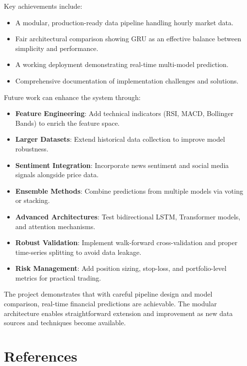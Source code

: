 \documentclass[conference]{IEEEtran}
\begin{document}
Key achievements include:
\begin{itemize}
    \item A modular, production-ready data pipeline handling hourly market data.
    \item Fair architectural comparison showing GRU as an effective balance between simplicity and performance.
    \item A working deployment demonstrating real-time multi-model prediction.
    \item Comprehensive documentation of implementation challenges and solutions.
\end{itemize}

Future work can enhance the system through:
\begin{itemize}
    \item \textbf{Feature Engineering}: Add technical indicators (RSI, MACD, Bollinger Bands) to enrich the feature space.
    \item \textbf{Larger Datasets}: Extend historical data collection to improve model robustness.
    \item \textbf{Sentiment Integration}: Incorporate news sentiment and social media signals alongside price data.
    \item \textbf{Ensemble Methods}: Combine predictions from multiple models via voting or stacking.
    \item \textbf{Advanced Architectures}: Test bidirectional LSTM, Transformer models, and attention mechanisms.
    \item \textbf{Robust Validation}: Implement walk-forward cross-validation and proper time-series splitting to avoid data leakage.
    \item \textbf{Risk Management}: Add position sizing, stop-loss, and portfolio-level metrics for practical trading.
\end{itemize}

The project demonstrates that with careful pipeline design and model comparison, real-time financial predictions are achievable. The modular architecture enables straightforward extension and improvement as new data sources and techniques become available.

\section*{References}


\end{document}

